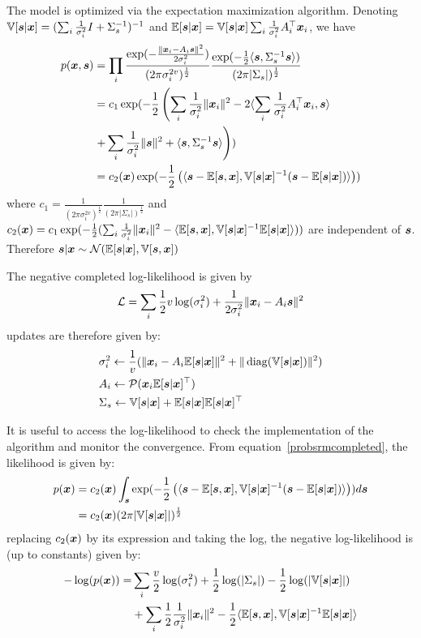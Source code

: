 The model is optimized via the expectation maximization algorithm.
Denoting $\mathbb{V}[\boldsymbol{s} | \boldsymbol{x}] = (\sum_i \frac1{\sigma_i^2} I +
\Sigma_s^{-1})^{-1}$ and $\mathbb{E}[\boldsymbol{s} | \boldsymbol{x}] = \mathbb{V}[\boldsymbol{s} | \boldsymbol{x}] \sum_i \frac1{\sigma_i^2}
A_i^{\top}\boldsymbol{x}_i$, we have
\begin{align}
  p(\boldsymbol{x}, \boldsymbol{s}) &= \prod_i \frac{\exp(-\frac{\|\boldsymbol{x}_i - A_i \boldsymbol{s} \|^2}{2 \sigma_i^2})}{(2 \pi \sigma_i^{2v})^{\frac12}} \frac{\exp(-\frac12 \langle{ \boldsymbol{s}},{ \Sigma_s^{-1} \boldsymbol{s} }\rangle )}{(2 \pi | \Sigma_s|)^{\frac12}} \\
               &= c_1 \exp(-\frac12 \left( \sum_i \frac1{\sigma_i^2}\|\boldsymbol{x}_i\|^2 - 2  \langle{ \sum_i \frac1{\sigma_i^2} A_i^{\top}\boldsymbol{x}_i},{ \boldsymbol{s} }\rangle \right. \\& \left.+ \sum_i \frac1{\sigma_i^2} \| \boldsymbol{s} \|^2 + \langle{ \boldsymbol{s}},{ \Sigma_s^{-1} \boldsymbol{s} }\rangle  \right)) \\
               &= c_2(\boldsymbol{x}) \exp(-\frac12 \left( \langle{  \boldsymbol{s}- \mathbb{E}[\boldsymbol{s}},{ \boldsymbol{x}], \mathbb{V}[\boldsymbol{s} | \boldsymbol{x}]^{-1} ( \boldsymbol{s} - \mathbb{E}[\boldsymbol{s} | \boldsymbol{x}])  }\rangle \right)) \label{probsrmcompleted}
\end{align}
where $c_1 = \frac1{(2 \pi \sigma_i^{2v})^{\frac12}}\frac1{(2 \pi |
  \Sigma_s|)^{\frac12}}$ and $c_2(\boldsymbol{x}) = c_1 \exp(-\frac12( \sum_i
\frac1{\sigma_i^2}\|\boldsymbol{x}_i\|^2 - \langle{  \mathbb{E}[\boldsymbol{s}},{ \boldsymbol{x}], \mathbb{V}[\boldsymbol{s} | \boldsymbol{x}]^{-1} \mathbb{E}[\boldsymbol{s} | \boldsymbol{x}] }\rangle))$ are independent of $\boldsymbol{s}$.
Therefore $\boldsymbol{s}| \boldsymbol{x} \sim \mathcal{N}(\mathbb{E}[\boldsymbol{s} | \boldsymbol{x}], \mathbb{V}[\boldsymbol{s}, \boldsymbol{x}])$

The negative completed log-likelihood is given by
\begin{align}
	\mathcal{L} = \sum_i \frac12 v \log(\sigma_i^2) + \frac1{2 \sigma_i^2} \| \boldsymbol{x}_i - A_i \boldsymbol{s} \|^2
\end{align}
updates are therefore given by:
\begin{align}
&\sigma_i^2 \leftarrow \frac1{v} (\| \boldsymbol{x}_i - A_i \mathbb{E}[\boldsymbol{s}|\boldsymbol{x}]\|^2 + \| \operatorname*{diag}(\mathbb{V}[\boldsymbol{s} | \boldsymbol{x}]) \|^2) \\
  &A_i \leftarrow \mathcal{P}(\boldsymbol{x}_i \mathbb{E}[\boldsymbol{s}|\boldsymbol{x}]^{\top}) \label{eq:psrm:Aiupdate} \\
  & \Sigma_s \leftarrow \mathbb{V}[\boldsymbol{s} | \boldsymbol{x}] + \mathbb{E}[\boldsymbol{s} | \boldsymbol{x}] \mathbb{E}[\boldsymbol{s} | \boldsymbol{x}]^{\top}
\end{align}

It is useful to access the log-likelihood to check the implementation of the
algorithm and monitor the convergence. From equation~\eqref{probsrmcompleted},
the likelihood is given by:
\begin{align}
  p(\boldsymbol{x}) &= c_2(\boldsymbol{x}) \int_{\boldsymbol{s}} \exp(-\frac12 \left( \langle{  \boldsymbol{s}- \mathbb{E}[\boldsymbol{s}},{ \boldsymbol{x}], \mathbb{V}[\boldsymbol{s} | \boldsymbol{x}]^{-1} ( \boldsymbol{s} - \mathbb{E}[\boldsymbol{s} | \boldsymbol{x}])  }\rangle \right)) d\boldsymbol{s} \\
         &= c_2(\boldsymbol{x}) (2 \pi |\mathbb{V}[\boldsymbol{s} | \boldsymbol{x}]|)^{\frac12}
\end{align}
replacing $c_2(\boldsymbol{x})$ by its expression and taking the log, the negative
log-likelihood is (up to constants) given by:
\begin{align}
  -\log(p(\boldsymbol{x})) = &\sum_i \frac{v}{2} \log(\sigma_i^2) + \frac12 \log(|\Sigma_s|) - \frac12 \log(|\mathbb{V}[\boldsymbol{s} | \boldsymbol{x}]|) \\ &+ \sum_i
  \frac12 \frac1{\sigma_i^2}\|\boldsymbol{x}_i\|^2 - \frac12 \langle{  \mathbb{E}[\boldsymbol{s}},{ \boldsymbol{x}], \mathbb{V}[\boldsymbol{s} | \boldsymbol{x}]^{-1} \mathbb{E}[\boldsymbol{s} | \boldsymbol{x}] }\rangle
\end{align}

